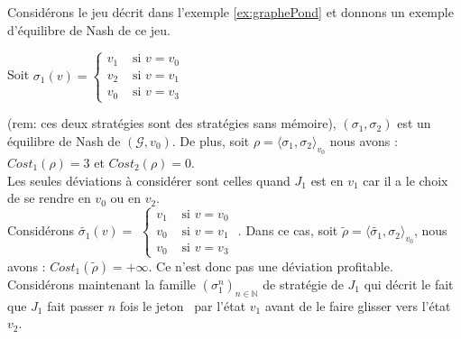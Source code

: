 
\begin{exemple}
	Considérons le jeu décrit dans l'exemple \ref{ex:graphePond} et donnons un exemple d'équilibre de Nash de ce jeu.\\
	
	 \begin{minipage}[c]{0.4\linewidth}Soit $\sigma _{1}(v) =\begin{cases}
						 v_{1} & \text{ si } v = v_{0}\\
						 v_{2} & \text{ si } v = v_{1}\\
						 v_{0} & \text{ si } v = v_{3}
						\end{cases}$ \end{minipage} \hfill
	\begin{minipage}[c]{0.1\linewidth}\end{minipage} \hfill \begin{minipage}[c]{0.30\linewidth}	 \end{minipage} \newline
		
\noindent	(rem: ces deux stratégies sont des stratégies sans mémoire), $(\sigma _{1}, \sigma _{2})$ est un équilibre de Nash de $(\mathcal{G}, v_{0})$. De plus, soit $\rho = \langle \sigma _{1},\sigma _{2} \rangle_{v_0}$ nous avons : $Cost_{1}(\rho) = 3$ et $Cost_{2}(\rho) = 0$.\\
	Les seules déviations à considérer sont celles quand $J_{1}$ est en $v_{1}$ car il a le choix de se rendre en $v_{0}$ ou en $v_{2}$.\\ Considérons $\tilde{\sigma _{1}}(v) = $ $\begin{cases}
						 v_{1} & \text{ si } v = v_{0}\\
						 v_{0} & \text{ si } v = v_{1}\\
						 v_{0} & \text{ si } v = v_{3}
						\end{cases}$ .
Dans ce cas, soit $\tilde{\rho} = \langle \tilde{\sigma _{1}},\sigma _{2} \rangle_{v_0}$, nous avons : \mbox{$Cost_{1}(\tilde{\rho}) = + \infty$}. Ce n'est donc pas une déviation profitable.\\
Considérons maintenant la famille $(\sigma _{1}^{n})_{n \in \mathbb{N}}$ de stratégie de $J_{1}$ qui décrit le fait que $J_{1}$ fait passer $n$ fois le \og jeton \fg~par l'état $v_{1}$ avant de le faire glisser vers l'état $v_{2}$. \\


\end{exemple}
